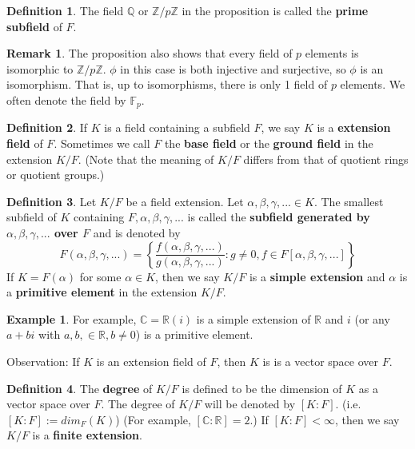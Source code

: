 \documentclass{article}
\theoremstyle{definition}
\newtheorem{ex}{Example}
\newtheorem{dfn}{Definition}
\newtheorem{rem}{Remark}
\begin{document}
\begin{dfn}
	The field $\mathbb{Q}$ or $\mathbb{Z} /p \mathbb{Z}$ in the proposition is called the \textbf{prime subfield} of $F$.
\end{dfn}

\begin{rem}
	The proposition also shows that every field of $p$ elements is isomorphic to $\mathbb{Z}/p \mathbb{Z}$.
	$\phi$ in this case is both injective and surjective, so $\phi$ is an isomorphism.
	That is, up to isomorphisms, there is only 1 field of $p$ elements. 
	We often denote the field by $\mathbb{F}_p$.
\end{rem}

\begin{dfn}
	If $K$ is a field containing a subfield $F$, we say $K$ is a \textbf{extension field} of $F$.
	Sometimes we call $F$ the \textbf{base field} or the \textbf{ground field} in the extension $K/F$. 
	(Note that the meaning of $K/F$ differs from that of quotient rings or quotient groups.)
\end{dfn}

\begin{dfn}
	Let $K/F$ be a field extension.
	Let $\alpha, \beta, \gamma, ... \in K$.
	The smallest subfield of $K$ containing $F, \alpha, \beta, \gamma, ...$ is called the \textbf{subfield generated by $\alpha, \beta, \gamma, ...$ over $F$} and is denoted by 
	\[
		F(\alpha, \beta, \gamma, ...) = \left\{ \frac{f(\alpha, \beta, \gamma, ...)}{g(\alpha, \beta, \gamma, ...)}: g \neq 0, f \in F[\alpha, \beta, \gamma, ...] \right\} 
	\]
	If $K = F(\alpha)$ for some $\alpha \in K$, then we say $K/F$ is a \textbf{simple extension} and $\alpha$ is a \textbf{primitive element} in the extension $K/F$.

\end{dfn}

\begin{ex}
	For example, $\mathbb{C} = \mathbb{R}(i)$ is a simple extension of $\mathbb{R}$ and $i$ (or any $a + bi$ with $a, b, \in \mathbb{R}, b \neq 0$) is a primitive element. 
\end{ex}

\par Observation: If $K$ is an extension field of $F$, then $K$ is is a vector space over $F$.

\begin{dfn}
	The \textbf{degree} of $K/F$ is defined to be the dimension of $K$ as a vector space over $F$.
	The degree of $K/F$ will be denoted by $[K:F]$.
	(i.e. $[K:F] := dim_{F}(K)$) 
	(For example, $[\mathbb{C} : \mathbb{R}] = 2$.)
	If $[K:F] < \infty$, then we say $K/F$ is a \textbf{finite extension}.
\end{dfn}
\end{document}
